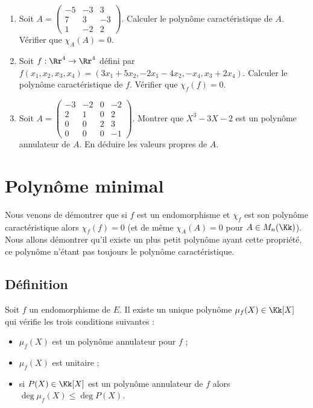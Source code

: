 \documentclass[12pt, class=report,crop=false]{standalone}
\begin{document}
\begin{miniexercices}
\sauteligne
\begin{enumerate}
  \item Soit $A = \left(\begin{smallmatrix}
  -5 & -3 & 3 \\
  7 & 3 & -3 \\
  1 & -2 & 2
  \end{smallmatrix}\right)$. Calculer le polynôme caractéristique de $A$. 
  Vérifier que $\chi_A(A) = 0$.

  
  \item Soit $f : \Rr^4 \to \Rr^4$ défini par
  $f(x_1,x_2,x_3,x_4) = (3x_1+5x_2,-2x_1-4x_2,-x_4,x_3+2x_4)$.
  Calculer le polynôme caractéristique de $f$. Vérifier que $\chi_f(f) = 0$.

  
  \item Soit $A = 
  \left(\begin{smallmatrix}
  -3 & -2 & 0 & -2 \\
2 & 1 & 0 & 2 \\
0 & 0 & 2 & 3 \\
0 & 0 & 0 & -1  
\end{smallmatrix}\right)$. Montrer
  que $X^3 - 3X - 2$ est un polynôme annulateur de $A$. 
  En déduire les valeurs propres de $A$.
\end{enumerate}
\end{miniexercices}



\section{Polynôme minimal}


Nous venons de démontrer que si $f$ est un endomorphisme et $\chi_f$ est son 
polynôme caractéristique alors $\chi_f(f)=0$ (et de même $\chi_A(A)=0$ pour $A\in M_n(\Kk)$). 
Nous allons démontrer qu'il existe un plus petit polynôme ayant cette propriété, ce polynôme n'étant pas toujours le polynôme caractéristique.


\subsection{Définition}



\begin{proposition}
\label{prop:polymini1}
Soit $f$ un endomorphisme de $E$. Il existe un unique polynôme $\mu_f(X) \in \Kk[X]$ 
qui vérifie les trois conditions suivantes :
\begin{itemize}
  \item $\mu_f(X)$ est un polynôme annulateur pour $f$ ;
  \item $\mu_f(X)$ est unitaire ;
  \item si $P(X) \in \Kk[X]$  est un polynôme annulateur de $f$ alors $\deg \mu_f(X) \le \deg P(X)$.
\end{itemize}
\end{proposition} 
\end{document}
